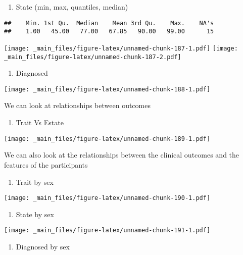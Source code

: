 \documentclass[
]{book}
\providecommand{\tightlist}{%
  \setlength{\itemsep}{0pt}\setlength{\parskip}{0pt}}
\begin{document}
\begin{enumerate}
\def\labelenumi{\alph{enumi}.}
\setcounter{enumi}{1}
\tightlist
\item
  State (min, max, quantiles, median)
\end{enumerate}

\begin{verbatim}
##    Min. 1st Qu.  Median    Mean 3rd Qu.    Max.    NA's 
##    1.00   45.00   77.00   67.85   90.00   99.00      15
\end{verbatim}

\texttt{[image: \_main\_files/figure-latex/unnamed-chunk-187-1.pdf]} \texttt{[image: \_main\_files/figure-latex/unnamed-chunk-187-2.pdf]}

\begin{enumerate}
\def\labelenumi{\alph{enumi}.}
\setcounter{enumi}{2}
\tightlist
\item
  Diagnosed
\end{enumerate}

\texttt{[image: \_main\_files/figure-latex/unnamed-chunk-188-1.pdf]}

We can look at relationships between outcomes

\begin{enumerate}
\def\labelenumi{\alph{enumi}.}
\setcounter{enumi}{3}
\tightlist
\item
  Trait Vs Estate
\end{enumerate}

\texttt{[image: \_main\_files/figure-latex/unnamed-chunk-189-1.pdf]}

We can also look at the relationships between the clinical outcomes and the features of the participants

\begin{enumerate}
\def\labelenumi{\alph{enumi}.}
\setcounter{enumi}{4}
\tightlist
\item
  Trait by sex
\end{enumerate}

\texttt{[image: \_main\_files/figure-latex/unnamed-chunk-190-1.pdf]}

\begin{enumerate}
\def\labelenumi{\alph{enumi}.}
\setcounter{enumi}{5}
\tightlist
\item
  State by sex
\end{enumerate}

\texttt{[image: \_main\_files/figure-latex/unnamed-chunk-191-1.pdf]}

\begin{enumerate}
\def\labelenumi{\alph{enumi}.}
\setcounter{enumi}{6}
\tightlist
\item
  Diagnosed by sex
\end{enumerate}
\end{document}
